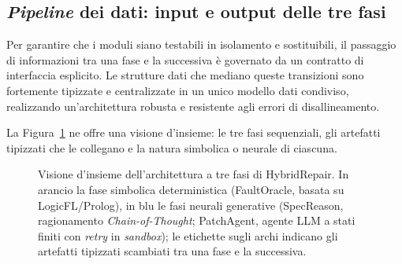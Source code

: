 \subsection{\textit{Pipeline} dei dati: input e output delle tre fasi}
Per garantire che i moduli siano testabili in isolamento e sostituibili, il passaggio di informazioni
tra una fase e la successiva è governato da un contratto di interfaccia esplicito. Le strutture dati che
mediano queste transizioni sono fortemente tipizzate e centralizzate in un unico modello dati condiviso,
realizzando un'architettura robusta e resistente agli errori di disallineamento.

La Figura~\ref{fig:architettura_pipeline} ne offre una visione d'insieme: le tre fasi sequenziali, gli
artefatti tipizzati che le collegano e la natura simbolica o neurale  di ciascuna.

\begin{figure}[H]
    \centering
    \caption{Visione d'insieme dell'architettura a tre fasi di HybridRepair. In arancio la fase simbolica
    deterministica (FaultOracle, basata su LogicFL/Prolog), in blu le fasi neurali generative (SpecReason,
    ragionamento \textit{Chain-of-Thought}; PatchAgent, agente LLM a stati finiti con \textit{retry} in
    \textit{sandbox}); le etichette sugli archi indicano gli artefatti tipizzati scambiati tra una fase e
    la successiva.}
    \label{fig:architettura_pipeline}
\end{figure}


